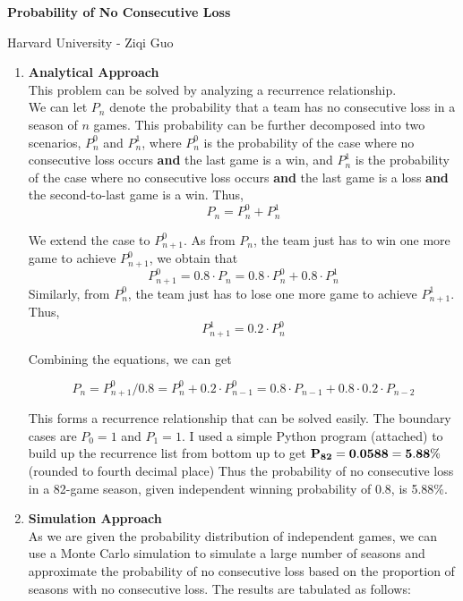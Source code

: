 \documentclass[12pt]{article}
\begin{document}
\begin{center}
\large\bf Probability of No Consecutive Loss
\end{center}
\begin{center}
\large
Harvard University - Ziqi Guo
\bigskip\\
\end{center}
\begin{enumerate}
\item{} \textbf{Analytical Approach}
\medskip\\
This problem can be solved by analyzing a recurrence relationship.
\medskip\\
We can let $P_n$ denote the probability that a team has no consecutive loss in a season of $n$ games. This probability can be further decomposed into two scenarios, $P_n^0$ and $P_n^1$, where $P_n^0$ is the probability of the case where no consecutive loss occurs \textbf{and} the last game is a win, and $P_n^1$ is the probability of the case where no consecutive loss occurs \textbf{and} the last game is a loss \textbf{and} the second-to-last game is a win. Thus, $$P_n=P_n^0+P_n^1$$

We extend the case to $P_{n+1}^0$. As from $P_n$, the team just has to win one more game to achieve $P_{n+1}^0$, we obtain that $$P_{n+1}^0=0.8\cdot P_n=0.8\cdot P_n^0+0.8\cdot P_n^1$$
Similarly, from $P_n^0$, the team just has to lose one more game to achieve $P_{n+1}^1$. Thus, $$P_{n+1}^1=0.2\cdot P_n^0$$

Combining the equations, we can get

$$P_n = P_{n+1}^0 / 0.8 = P_n^0+0.2\cdot P_{n-1}^0= 0.8\cdot P_{n-1}+0.8\cdot0.2\cdot P_{n-2}$$

This forms a recurrence relationship that can be solved easily. The boundary cases are $P_0=1$ and $P_1=1$. I used a simple Python program (attached) to build up the recurrence list from bottom up to get $\bf{P_{82}=0.0588=5.88\%}$ (rounded to fourth decimal place) Thus the probability of no consecutive loss in a 82-game season, given independent winning probability of 0.8, is 5.88\%.
\medskip\\

\item{} \textbf{Simulation Approach}
\medskip\\
As we are given the probability distribution of independent games, we can use a Monte Carlo simulation to simulate a large number of seasons and approximate the probability of no consecutive loss based on the proportion of seasons with no consecutive loss. The results are tabulated as follows:


\end{enumerate}
\end{document}
